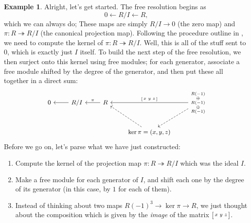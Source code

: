 \documentclass[12pt,a4paper]{article}
\theoremstyle{definition}
\newtheorem{example}[theorem]{Example}
\numberwithin{equation}{section}
\begin{document}
\begin{example}
    Alright, let's get started.
    The free resolution begins as
    \begin{equation*}
        0 \longleftarrow R/I \longleftarrow R,
    \end{equation*}
    which we can always do;
    These maps are simply $R/I \to 0$ (the zero map) and $\pi \colon R \twoheadrightarrow R/I$ (the canonical projection map).
    Following the procedure outline in , we need to compute the kernel of $\pi \colon R \twoheadrightarrow R/I$.
    Well, this is all of the stuff sent to $0$, which is exactly just $I$ itself.
    To build the next step of the free resolution, we then surject onto this kernel using free modules; for each generator, associate a free module shifted by the degree of the generator, and then put these all together in a direct sum:
    \begin{equation*}
    \small
    \begin{tikzcd}[ampersand replacement=\&]
        0 \& R/I \arrow[l] \& R \arrow[l,swap,"\pi"] \& {} \& \substack{R(-1) \\ \oplus \\ R(-1) \\ \oplus \\ R(-1)} \arrow[ll,swap,"{\begin{bsmallmatrix} x & y & z \end{bsmallmatrix}}"] \arrow[dl,dashed] \\
        {} \& {} \& {} \& \ker{\pi} = (x, y, z) \arrow[ul,dashed]
    \end{tikzcd}
    \end{equation*}
    Before we go on, let's parse what we have just constructed:
    \begin{enumerate}[label=(\arabic*)]
        \item Compute the kernel of the projection map $\pi \colon R \twoheadrightarrow R/I$ which was the ideal $I$.
        
        \item Make a free module for each generator of $I$, and shift each one by the degree of its generator (in this case, by $1$ for each of them).
        
        \item Instead of thinking about two maps $R(-1)^3 \to \ker{\pi} \to R$, we just thought about the composition which is given by the \emph{image} of the matrix $\begin{bsmallmatrix} x & y & z \end{bsmallmatrix}$.


\end{enumerate}
\end{example}
\end{document}
